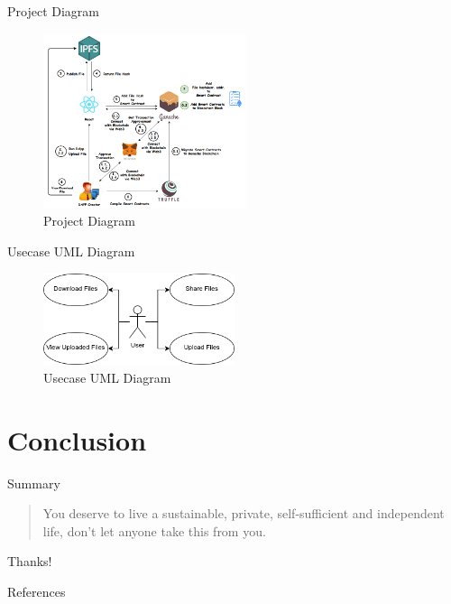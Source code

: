 \documentclass[aspectratio=169,usenames,dvipsnames,pdftex]{beamer}
\begin{document}
  \begin{frame}{Project Diagram}
    \begin{figure}
      \includegraphics[width=0.53\textwidth]{system-diagram.png}
      \caption{Project Diagram}
    \end{figure}
  \end{frame}

  \begin{frame}{Usecase UML Diagram}
    \begin{figure}
      \includegraphics[width=0.5\textwidth]{usecase-uml.png}
      \caption{Usecase UML Diagram}
    \end{figure}
  \end{frame}

	\section{Conclusion}

	\begin{frame}{Summary}
    \begin{quote}
      You deserve to live a sustainable, private, self-sufficient and independent life, don't let anyone take this from you.
    \end{quote}
	\end{frame}

	\begin{frame}[standout]
		Thanks!
	\end{frame}


	\begin{frame}[allowframebreaks]{References}
    \nocite{*}
    
		
	\end{frame}
\end{document}
